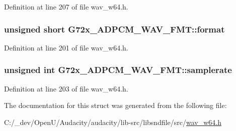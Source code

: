 Definition at line 207 of file wav\+\_\+w64.\+h.

\subsubsection[{\texorpdfstring{format}{format}}]{\setlength{\rightskip}{0pt plus 5cm}unsigned short G72x\+\_\+\+A\+D\+P\+C\+M\+\_\+\+W\+A\+V\+\_\+\+F\+M\+T\+::format}\hypertarget{struct_g72x___a_d_p_c_m___w_a_v___f_m_t_ab9445f1c1fa7a932266e9b4ce7baedfd}{}\label{struct_g72x___a_d_p_c_m___w_a_v___f_m_t_ab9445f1c1fa7a932266e9b4ce7baedfd}


Definition at line 201 of file wav\+\_\+w64.\+h.

\subsubsection[{\texorpdfstring{samplerate}{samplerate}}]{\setlength{\rightskip}{0pt plus 5cm}unsigned {\bf int} G72x\+\_\+\+A\+D\+P\+C\+M\+\_\+\+W\+A\+V\+\_\+\+F\+M\+T\+::samplerate}\hypertarget{struct_g72x___a_d_p_c_m___w_a_v___f_m_t_a72e67d6d7b79218c15089b7b1ad46951}{}\label{struct_g72x___a_d_p_c_m___w_a_v___f_m_t_a72e67d6d7b79218c15089b7b1ad46951}


Definition at line 203 of file wav\+\_\+w64.\+h.



The documentation for this struct was generated from the following file\+:\begin{DoxyCompactItemize}
\item 
C\+:/\+\_\+dev/\+Open\+U/\+Audacity/audacity/lib-\/src/libsndfile/src/\hyperlink{wav__w64_8h}{wav\+\_\+w64.\+h}\end{DoxyCompactItemize}

